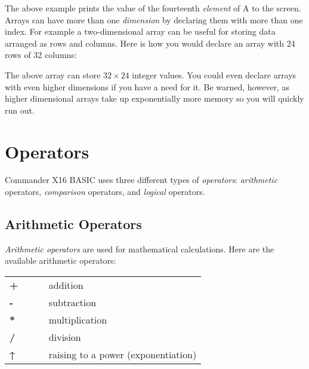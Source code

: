 
The above example prints the value of the fourteenth \emph{element} of
{\ttfamily A} to the screen.\\

Arrays can have more than one \emph{dimension} by declaring them with more than
one index.  For example a two-dimensional array can be useful for storing data
arranged as rows and columns.  Here is how you would declare an array with 24
rows of 32 columns:\\


The above array can store $32 \times 24$ integer values.  You could even
declare arrays with even higher dimensions if you have a need for it.  Be
warned, however, as higher dimensional arrays take up exponentially more memory
so you will quickly run out.\\

\section{Operators}

Commander X16 BASIC uses three different types of \emph{operators}:
\emph{arithmetic} operators, \emph{comparison} operators, and \emph{logical}
operators.

\subsection{Arithmetic Operators}

\emph{Arithmetic operators} are used for mathematical calculations.  Here are
the available arithmetic operators:\\

\begin{tabular}{l p{0.8\linewidth}}
	\ttfamily\bfseries{+}&addition\\
	\ttfamily\bfseries{-}&subtraction\\
	\ttfamily\bfseries{*}&multiplication\\
	\ttfamily\bfseries{/}&division\\
	\ttfamily\bfseries{↑}&raising to a power (exponentiation)\\
\end{tabular}

\vspace{16pt}

